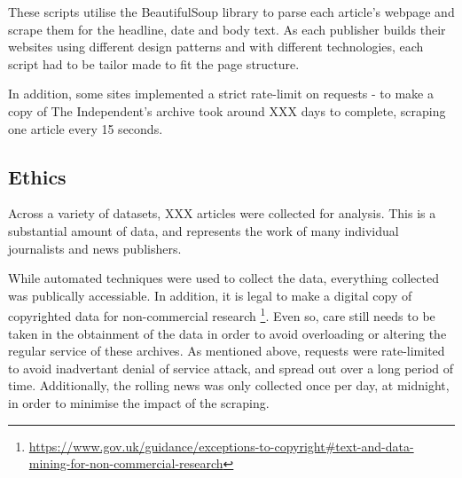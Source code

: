 \documentclass[12pt,a4paper]{article}
\begin{document}
These scripts utilise the BeautifulSoup library to parse each article's webpage and scrape them for the headline, date and body text. As each publisher builds their websites using different design patterns and with different technologies, each script had to be tailor made to fit the page structure.

In addition, some sites implemented a strict rate-limit on requests - to make a copy of The Independent's archive took around XXX days to complete, scraping one article every 15 seconds. 

\subsection{Ethics}
Across a variety of datasets, XXX articles were collected for analysis. This is a substantial amount of data, and represents the work of many individual journalists and news publishers. 

While automated techniques were used to collect the data, everything collected was publically accessiable. In addition, it is legal to make a digital copy of copyrighted data for non-commercial research \footnote{\url{https://www.gov.uk/guidance/exceptions-to-copyright#text-and-data-mining-for-non-commercial-research}}. Even so, care still needs to be taken in the obtainment of the data in order to avoid overloading or altering the regular service of these archives. As mentioned above, requests were rate-limited to avoid inadvertant denial of service attack, and spread out over a long period of time. Additionally, the rolling news was only collected once per day, at midnight, in order to minimise the impact of the scraping.




\end{document}
